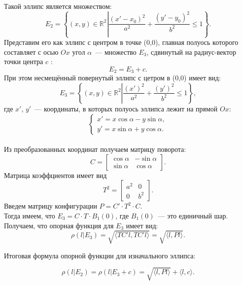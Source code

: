 \documentclass[11pt]{article}
\theoremstyle{definition}
\begin{document}
\begin{enumerate}
            Такой эллипс является множеством:
            \[
            E_2 = \left\{(x, y) \in \mathbb{R}^2 \left| \frac{(x'- x_0) ^2}{a^2} + \frac{(y'-y_0)^2}{b^2} \right.\leqslant 1\right\}.
            \] 
            Представим его как эллипс с центром в точке (0,0), главная полуось которого составляет с осью $Ox$ угол $\alpha$~--- множество $E_3$, сдвинутый на радиус-вектор точки центра $c$ :
            \[
            E_2 =  E_3 + c.
            \]
            При этом несмещённый повернутый эллипс с цетром в (0,0) имеет вид:
            \[
            E_3 = \left\{(x, y) \in \mathbb{R}^2 \left| \frac{(x')^2}{a^2} + \frac{(y')^2}{b^2} \right.\leqslant 1\right\},
            \] 
            где $x'$, $y'$~--- координаты, в которых полуось эллипса лежит на прямой $Ox$:
            \[\begin{cases}
            x'   = x\cos\alpha - y\sin\alpha,  
            \\
            y'   = x\sin\alpha + y\cos\alpha. 
            \end{cases}
            \]
            \\
            Из преобразованных координат получаем матрицу поворота:
            \[
            C = \begin{bmatrix} \cos\alpha & -\sin\alpha 
            \\ \sin\alpha & \cos\alpha \end{bmatrix}.
            \]
            Матрица коэффциентов имеет вид
            \[
            T^2 = \begin{bmatrix} a^2 & 0 \\ 0 & b^2 \end{bmatrix}.
            \]
            Введем матрицу конфигурации $P = C'\cdot T^2\cdot C$. \\
            Тогда имеем, что $E_3 = C\cdot T\cdot B_1(0)$, где $B_1(0)$~--- это единичный шар.
            Получаем, что опорная функция для $E_3$ имеет вид:
            \[
            \rho( l \left| E_3\right.) = \sqrt{\langle TC'l, TC'l\rangle } =  \sqrt{\langle l,Pl\rangle }.
            \]
            
            Итоговая формула опорной функции для изначального эллипса: 
            
            \[\rho( l \left| E_2\right.) = \rho( l \left| E_3\right. + c) = \sqrt{\langle l,Pl\rangle } + \langle l, c\rangle.
            \]
            
        \end{enumerate}
	
\end{document}
